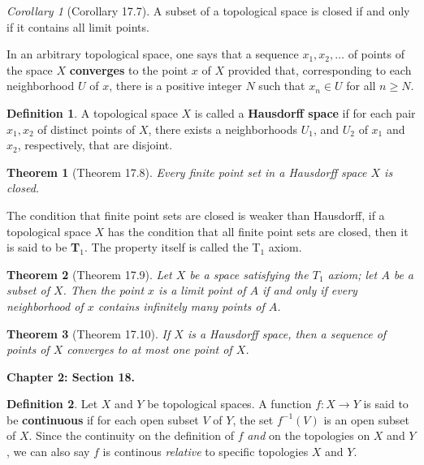 \documentclass{article}
\newtheorem{theorem}{Theorem}
\theoremstyle{definition}
\newtheorem{definition}{Definition}[section]
\theoremstyle{remark}
\newtheorem{corollary}{Corollary}[theorem]
\begin{document}
    \begin{corollary}[Corollary 17.7]
        A subset of a topological space is closed if and only if it contains all limit points.
    \end{corollary}

    In an arbitrary topological space, one says that a sequence $x_1,x_2,\hdots$ of points of the space $X$ \textbf{converges} to
    the point $x$ of $X$ provided that, corresponding to each neighborhood $U$ of $x$, there is a positive integer $N$ such that
    $x_n\in U$ for all $n\geq N$.

    \begin{definition}
        A topological space $X$ is called a \textbf{Hausdorff space} if for each pair $x_1,x_2$ of distinct points of $X$,
        there exists a neighborhoods $U_1$, and $U_2$ of $x_1$ and $x_2$, respectively, that are disjoint.
    \end{definition}

    \begin{theorem}[Theorem 17.8]
        Every finite point set in a Hausdorff space $X$ is closed.
    \end{theorem}

    The condition that finite point sets are closed is weaker than Hausdorff, if a topological space $X$ has the condition
    that all finite point sets are closed, then it is said to be \textbf{T$_1$}. The property itself is called the T$_1$ axiom.

    \begin{theorem}[Theorem 17.9]
        Let $X$ be a space satisfying the $T_1$ axiom; let $A$ be a subset of $X$. Then the point $x$ is a limit point of $A$ if and
        only if every neighborhood of $x$ contains infinitely many points of $A$.
    \end{theorem}

    \begin{theorem}[Theorem 17.10]
        If $X$ is a Hausdorff space, then a sequence of points of $X$ converges to at most one point of $X$.
    \end{theorem}

    \newpage

    \textbf{Chapter 2: Section 18.}
    \begin{definition}
        Let $X$ and $Y$ be topological spaces. A function $f: X\to Y$ is said to be \textbf{continuous} if for each open subset
        $V$ of $Y$, the set $f^{-1}(V)$ is an open subset of $X$. Since the continuity on the definition of $f$ \textit{and} on the
        topologies on $X$ and $Y$, we can also say $f$ is continous \textit{relative} to specific topologies $X$ and $Y$.
    \end{definition}
\end{document}
